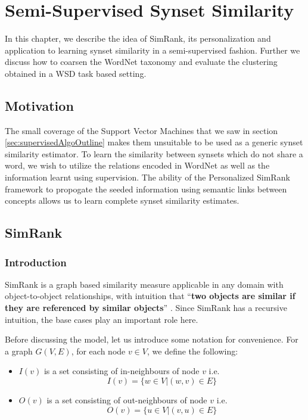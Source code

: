 \chapter{Semi-Supervised Synset Similarity}
\label{chapter:Semi-SupervisedSynsetSimilarity}
In this chapter, we describe the idea of SimRank, its personalization and application to learning synset similarity in a semi-supervised fashion. Further we discuss how to coarsen the WordNet taxonomy and evaluate the clustering obtained in a WSD task based setting.

\section{Motivation}
The small coverage of the Support Vector Machines that we saw in section \ref{sec:supervisedAlgoOutline} makes them unsuitable to be used as a generic synset similarity estimator. To learn the similarity between synsets which do not share a word, we wish to utilize the relations encoded in WordNet as well as the information learnt using supervision. 
The ability of the Personalized SimRank framework to propogate the seeded information using semantic links between concepts allows us to learn complete synset similarity estimates.

\section{SimRank}
\label{sec:SimRank}
\subsection{Introduction}
SimRank \citep{Jeh02simrank} is a graph based similarity measure applicable in any domain with object-to-object relationships, with intuition that ``\textbf{two objects are similar if they are referenced by similar objects}'' \citep{Jeh02simrank} \citep{LizorkinSimrank}. Since SimRank has a recursive intuition, the base cases play an important role here.

Before discussing the model, let us introduce some notation for convenience. For a graph $G(V,E)$, for each node $v \in V$, we define the following:
\begin{itemize}
\item $I(v)$ is a set consisting of in-neighbours of node $v$ i.e.
\begin{equation}
I(v) = \{w\in V | (w,v)\in E\}
\end{equation}
\item $O(v)$ is a set consisting of out-neighbours of node $v$ i.e.
\begin{equation}
O(v) = \{u\in V | (v,u)\in E\}
\end{equation}
\end{itemize}

